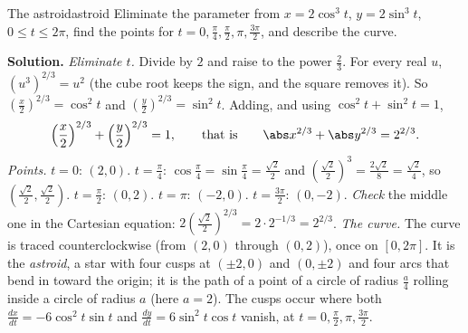 \documentclass[11pt]{article}
\begin{document}
\begin{exmp}{The astroid}{astroid}
Eliminate the parameter from $x=2\cos^3t$, $y=2\sin^3t$, $0\le t\le2\pi$, find the points for $t=0,\frac\pi4,\frac\pi2,\pi,\frac{3\pi}2$, and describe the curve.

\textbf{Solution.} \emph{Eliminate $t$.} Divide by $2$ and raise to the power $\frac23$. For every real $u$, $(u^3)^{2/3}=u^2$ (the cube root keeps the sign, and the square removes it). So $\left(\frac x2\right)^{2/3}=\cos^2t$ and $\left(\frac y2\right)^{2/3}=\sin^2t$. Adding, and using $\cos^2t+\sin^2t=1$,
\[
\left(\frac x2\right)^{2/3}+\left(\frac y2\right)^{2/3}=1,\qquad\text{that is}\qquad \abs x^{2/3}+\abs y^{2/3}=2^{2/3}.
\]
\emph{Points.} $t=0$: $(2,0)$. $t=\frac\pi4$: $\cos\frac\pi4=\sin\frac\pi4=\frac{\sqrt2}2$ and $\left(\frac{\sqrt2}2\right)^3=\frac{2\sqrt2}8=\frac{\sqrt2}4$, so $(\frac{\sqrt2}2,\frac{\sqrt2}2)$. $t=\frac\pi2$: $(0,2)$. $t=\pi$: $(-2,0)$. $t=\frac{3\pi}2$: $(0,-2)$. \emph{Check} the middle one in the Cartesian equation: $2\left(\frac{\sqrt2}2\right)^{2/3}=2\cdot2^{-1/3}=2^{2/3}$.
\emph{The curve.} The curve is traced counterclockwise (from $(2,0)$ through $(0,2)$), once on $[0,2\pi]$. It is the \emph{astroid}, a star with four cusps at $(\pm2,0)$ and $(0,\pm2)$ and four arcs that bend in toward the origin; it is the path of a point of a circle of radius $\frac a4$ rolling inside a circle of radius $a$ (here $a=2$). The cusps occur where both $\frac{dx}{dt}=-6\cos^2t\sin t$ and $\frac{dy}{dt}=6\sin^2t\cos t$ vanish, at $t=0,\frac\pi2,\pi,\frac{3\pi}2$.
\end{exmp}
\end{document}

